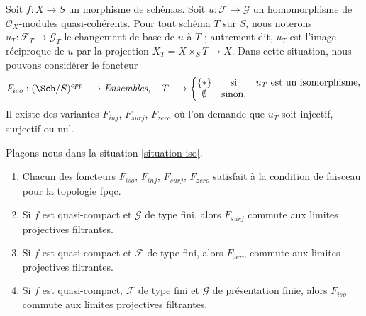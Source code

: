 \begin{situation}
\label{situation-iso}
Soit $f : X \to S$ un morphisme de schémas.
Soit $u : \mathcal{F} \to \mathcal{G}$ un homomorphisme de
$\mathcal{O}_X$-modules quasi-cohérents. Pour tout schéma $T$ sur
$S$, nous noterons $u_T : \mathcal{F}_T \to \mathcal{G}_T$ le
changement de base de $u$ à $T$ ; autrement dit, $u_T$ est l'image réciproque
de $u$ par la projection $X_T = X \times_S T \to X$.
Dans cette situation, nous pouvons considérer le foncteur
\begin{equation}
\label{equation-iso}
F_{iso} : (\Sch/S)^{opp} \longrightarrow \textit{Ensembles}, \quad
T \longrightarrow \left\{
\begin{matrix}
\{*\} & \text{si} & u_T \text{ est un isomorphisme}, \\
\emptyset & \text{sinon.} &
\end{matrix}
\right.
\end{equation}
Il existe des variantes $F_{inj}$, $F_{surj}$, $F_{zero}$ où l'on demande que
$u_T$ soit injectif, surjectif ou nul.
\end{situation}

\begin{lemma}
\label{lemma-iso-sheaf}
Plaçons-nous dans la situation \ref{situation-iso}.
\begin{enumerate}
\item Chacun des foncteurs $F_{iso}$, $F_{inj}$, $F_{surj}$, $F_{zero}$
satisfait à la condition de faisceau pour la topologie fpqc.
\item Si $f$ est quasi-compact et $\mathcal{G}$ de type fini,
alors $F_{surj}$ commute aux limites projectives filtrantes.
\item Si $f$ est quasi-compact et $\mathcal{F}$ de type fini, alors
$F_{zero}$ commute aux limites projectives filtrantes.
\item Si $f$ est quasi-compact, $\mathcal{F}$ de type fini et
$\mathcal{G}$ de présentation finie, alors $F_{iso}$ commute aux limites projectives filtrantes.
\end{enumerate}
\end{lemma}

